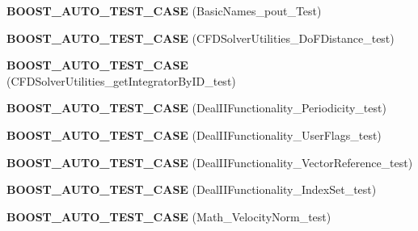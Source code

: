 \begin{DoxyCompactItemize}
\item 
\hypertarget{namespacenatrium_a063d598f02838b791545695ce7c2bb8d}{
{\bfseries BOOST\_\-AUTO\_\-TEST\_\-CASE} (BasicNames\_\-pout\_\-Test)}
\label{namespacenatrium_a063d598f02838b791545695ce7c2bb8d}

\item 
\hypertarget{namespacenatrium_a373dbad4fef7c7a61a60bdb02ad96334}{
{\bfseries BOOST\_\-AUTO\_\-TEST\_\-CASE} (CFDSolverUtilities\_\-DoFDistance\_\-test)}
\label{namespacenatrium_a373dbad4fef7c7a61a60bdb02ad96334}

\item 
\hypertarget{namespacenatrium_aefd330df08a36589588646c79b6484db}{
{\bfseries BOOST\_\-AUTO\_\-TEST\_\-CASE} (CFDSolverUtilities\_\-getIntegratorByID\_\-test)}
\label{namespacenatrium_aefd330df08a36589588646c79b6484db}

\item 
\hypertarget{namespacenatrium_a334239f5dfc2861c3d722ceab11d956b}{
{\bfseries BOOST\_\-AUTO\_\-TEST\_\-CASE} (DealIIFunctionality\_\-Periodicity\_\-test)}
\label{namespacenatrium_a334239f5dfc2861c3d722ceab11d956b}

\item 
\hypertarget{namespacenatrium_ae2b885e6d3e03dc649f0bd44295ad701}{
{\bfseries BOOST\_\-AUTO\_\-TEST\_\-CASE} (DealIIFunctionality\_\-UserFlags\_\-test)}
\label{namespacenatrium_ae2b885e6d3e03dc649f0bd44295ad701}

\item 
\hypertarget{namespacenatrium_afe0d974e8e27371c1cfbede14560dc72}{
{\bfseries BOOST\_\-AUTO\_\-TEST\_\-CASE} (DealIIFunctionality\_\-VectorReference\_\-test)}
\label{namespacenatrium_afe0d974e8e27371c1cfbede14560dc72}

\item 
\hypertarget{namespacenatrium_a5bdafd6bf42964ea54804589a5991a67}{
{\bfseries BOOST\_\-AUTO\_\-TEST\_\-CASE} (DealIIFunctionality\_\-IndexSet\_\-test)}
\label{namespacenatrium_a5bdafd6bf42964ea54804589a5991a67}

\item 
\hypertarget{namespacenatrium_a1ccd12b5301561e908ab18bec38078c3}{
{\bfseries BOOST\_\-AUTO\_\-TEST\_\-CASE} (Math\_\-VelocityNorm\_\-test)}
\label{namespacenatrium_a1ccd12b5301561e908ab18bec38078c3}

\end{DoxyCompactItemize}
